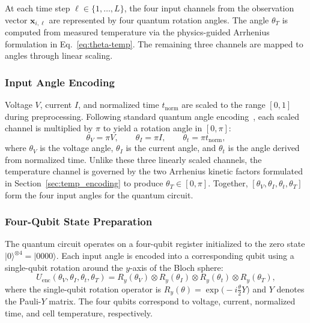 \documentclass[a4paper,fleqn]{cas-sc}
\begin{document}
At each time step $\ell \in \{1, \dots, L\}$, the four input channels from the observation vector $\mathbf{x}_{i,\ell}$ are represented by four quantum rotation angles. The angle $\theta_T$ is computed from measured temperature via the physics-guided Arrhenius formulation in Eq.~\eqref{eq:theta-temp}. The remaining three channels are mapped to angles through linear scaling.

\subsubsection{Input Angle Encoding}

Voltage $V$, current $I$, and normalized time $t_{\mathrm{norm}}$ are scaled to the range $[0, 1]$ during preprocessing. Following standard quantum angle encoding~\citep{hirai2024practical,ovalle2023quantum}, each scaled channel is multiplied by $\pi$ to yield a rotation angle in $[0, \pi]$:
\begin{equation}
\theta_V = \pi V, \qquad \theta_I = \pi I, \qquad \theta_t = \pi t_{\mathrm{norm}},
\label{eq:input_angles}
\end{equation}
where $\theta_V$ is the voltage angle, $\theta_I$ is the current angle, and $\theta_t$ is the angle derived from normalized time. Unlike these three linearly scaled channels, the temperature channel is governed by the two Arrhenius kinetic factors formulated in Section~\ref{sec:temp_encoding} to produce $\theta_T \in [0, \pi]$. Together, $[\theta_V, \theta_I, \theta_t, \theta_T]$ form the four input angles for the quantum circuit.

\subsubsection{Four-Qubit State Preparation}

The quantum circuit operates on a four-qubit register initialized to the zero state $\lvert 0\rangle^{\otimes 4} = \lvert 0000\rangle$. Each input angle is encoded into a corresponding qubit using a single-qubit rotation around the $y$-axis of the Bloch sphere:
\begin{equation}
U_{\mathrm{enc}}(\theta_V, \theta_I, \theta_t, \theta_T) = R_y(\theta_V) \otimes R_y(\theta_I) \otimes R_y(\theta_t) \otimes R_y(\theta_T),
\label{eq:u_enc}
\end{equation}
where the single-qubit rotation operator is $R_y(\theta) = \exp\bigl(-i\frac{\theta}{2}Y\bigr)$ and $Y$ denotes the Pauli-$Y$ matrix. The four qubits correspond to voltage, current, normalized time, and cell temperature, respectively.
\end{document}
